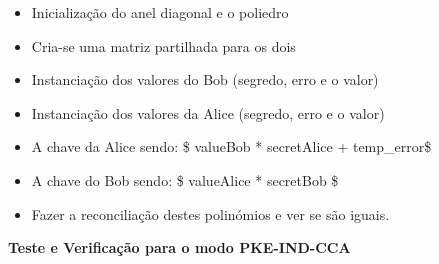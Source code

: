 \documentclass[12pt]{report}
\providecommand{\tightlist}{%
      \setlength{\itemsep}{0pt}\setlength{\parskip}{0pt}}
\begin{document}
\begin{itemize}
\tightlist
\item
  Inicialização do anel diagonal e o poliedro
\item
  Cria-se uma matriz partilhada para os dois
\item
  Instanciação dos valores do Bob (segredo, erro e o valor)
\item
  Instanciação dos valores da Alice (segredo, erro e o valor)
\item
  A chave da Alice sendo: \$ valueBob * secretAlice + temp\_error\$
\item
  A chave do Bob sendo: \$ valueAlice * secretBob \$
\item
  Fazer a reconciliação destes polinómios e ver se são iguais.
\end{itemize}
\vspace{3mm}

    \textbf{Teste e Verificação para o modo PKE-IND-CCA}
\end{document}

